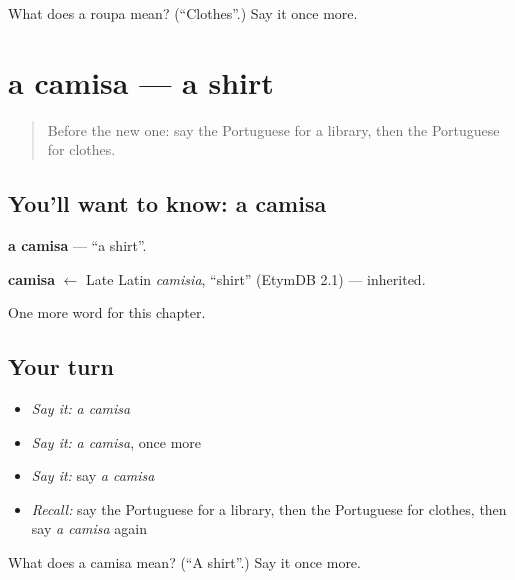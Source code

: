 \begin{tcolorbox}[breakable,colback=teal!4,colframe=teal!35!black,title={Before you move on}]
What does a roupa mean? (\textquotedblleft{}Clothes\textquotedblright{}.) Say it once more.
\end{tcolorbox}
\section[a camisa]{a camisa — a shirt}

\label{lesson:PT-C77-camisa}



\begin{quote}
Before the new one: say the Portuguese for a library, then the Portuguese for clothes.
\end{quote}

\subsection*{You'll want to know: a camisa}
\textbf{a camisa} — \textquotedblleft{}a shirt\textquotedblright{}.

\begin{cousinweb}
\textbf{camisa} $\leftarrow$ Late Latin \emph{camisia}, \textquotedblleft{}shirt\textquotedblright{} (EtymDB 2.1) — inherited.
\end{cousinweb}

\begin{grammarlens}[title={What you've built}]
One more word for this chapter.
\end{grammarlens}

\subsection*{Your turn}
\begin{itemize}
\raggedright
  \item \emph{Say it:} \emph{a camisa}
  \item \emph{Say it:} \emph{a camisa}, once more
  \item \emph{Say it:} say \emph{a camisa}
  \item \emph{Recall:} say the Portuguese for a library, then the Portuguese for clothes, then say \emph{a camisa} again
\end{itemize}

\begin{tcolorbox}[breakable,colback=teal!4,colframe=teal!35!black,title={Before you move on}]
What does a camisa mean? (\textquotedblleft{}A shirt\textquotedblright{}.) Say it once more.
\end{tcolorbox}
